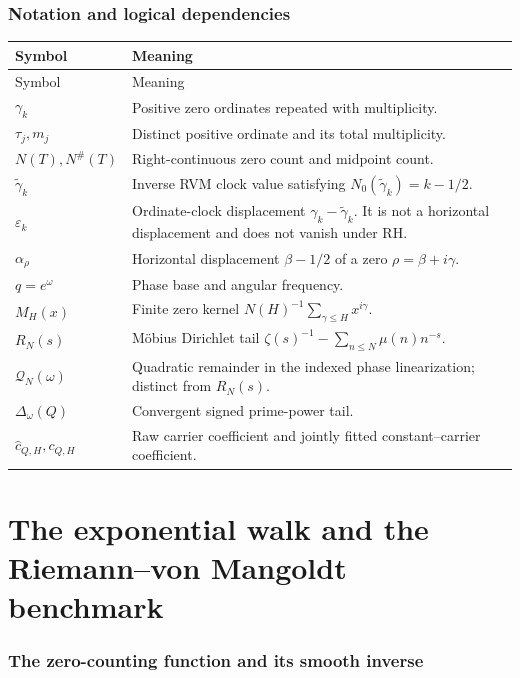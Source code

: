 \documentclass[11pt]{amsart}
\numberwithin{equation}{section}
\theoremstyle{plain}
\theoremstyle{definition}
\theoremstyle{remark}
\newcommand{\1}{\mathbf{1}}
\begin{document}
\section{Notation and logical dependencies}
\label{sec:notation_glossary}

\begin{longtable}{>{\raggedright\arraybackslash}p{}
                   >{\raggedright\arraybackslash}p{}}
\toprule
Symbol & Meaning \\
\midrule
\endfirsthead
\toprule
Symbol & Meaning \\
\midrule
\endhead
$\gamma_k$ & Positive zero ordinates repeated with multiplicity. \\
$\tau_j,m_j$ & Distinct positive ordinate and its total multiplicity. \\
$N(T),N^{\#}(T)$ & Right-continuous zero count and midpoint count. \\
$\widetilde\gamma_k$ & Inverse RVM clock value satisfying
$N_0(\widetilde\gamma_k)=k-1/2$. \\
$\varepsilon_k$ & Ordinate-clock displacement
$\gamma_k-\widetilde\gamma_k$.  It is not a horizontal displacement and
does not vanish under RH. \\
$\alpha_\rho$ & Horizontal displacement $\beta-1/2$ of a zero
$\rho=\beta+i\gamma$. \\
$q=e^\omega$ & Phase base and angular frequency. \\
$M_H(x)$ & Finite zero kernel
$N(H)^{-1}\sum_{\gamma\leq H}x^{i\gamma}$. \\
$R_N(s)$ & Möbius Dirichlet tail
$\zeta(s)^{-1}-\sum_{n\leq N}\mu(n)n^{-s}$. \\
$\mathcal Q_N(\omega)$ & Quadratic remainder in the indexed phase
linearization; distinct from $R_N(s)$. \\
$\Delta_\omega(Q)$ & Convergent signed prime-power tail. \\
$\widehat c_{Q,H},c_{Q,H}$ & Raw carrier coefficient and jointly fitted
constant--carrier coefficient. \\
\bottomrule
\end{longtable}

\part{The exponential walk and the Riemann--von Mangoldt benchmark}

\section{The zero-counting function and its smooth inverse}
\label{sec:rvm_counting_inverse}
\end{document}
